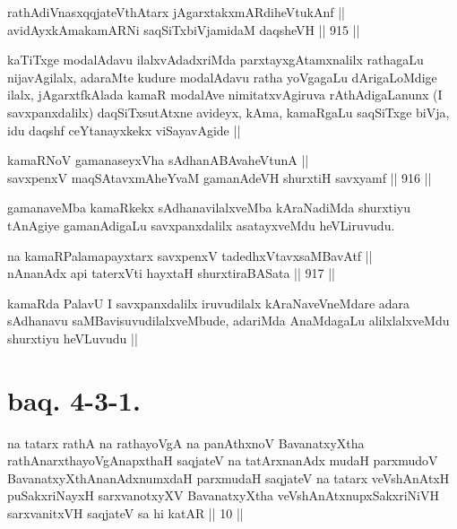 \begin{shl}
rathAdiVnasxqqjateV\s thAtarx jAgarxtakxmARdiheVtukAnf || \\
avidAyxkAmakamARNi saqSiTxbiVjamidaM daqsheVH ||  915 ||  
\end{shl}

\begin{artha}
kaTiTxge modalAdavu ilalxvAdadxriMda parxtayxgAtamxnalilx rathagaLu nijavAgilalx, adaraMte kudure modalAdavu ratha yoVgagaLu dArigaLoMdige ilalx, jAgarxtfkAlada kamaR modalAve nimitatxvAgiruva rAthAdigaLanunx (I savxpanxdalilx) daqSiTxsutAtxne avideyx, kAma, kamaRgaLu saqSiTxge biVja, idu daqshf ceYtanayxkekx viSayavAgide ||
\end{artha}


\begin{shl}
kamaRNoV gamanaseyxVha sAdhanABAvaheVtunA || \\
savxpenxV maqSAtavxmAheYvaM gamanAdeVH shurxtiH savxyamf ||  916 ||  
\end{shl}

\begin{artha}
gamanaveMba kamaRkekx sAdhanavilalxveMba kAraNadiMda shurxtiyu tAnAgiye gamanAdigaLu savxpanxdalilx asatayxveMdu heVLiruvudu.
\end{artha}


\begin{shl}
na kamaRPalamapayxtarx savxpenxV tadedhxVtavxsaMBavAtf || \\
nA\s \s nanAdx api taterxVti hayxtaH shurxtiraBASata ||  917 ||  
\end{shl}

\begin{artha}
kamaRda PalavU I savxpanxdalilx iruvudilalx kAraNaveVneMdare adara sAdhanavu saMBavisuvudilalxveMbude, adariMda AnaMdagaLu alilxlalxveMdu shurxtiyu heVLuvudu ||
\end{artha}

\section*{baq. 4-3-1.}

\begin{shl}
na tatarx rathA na rathayoVgA na panAthxnoV BavanatxyXtha rathAnarxthayoVgAnapxthaH saqjateV na tatArxnanAdx mudaH parxmudoV BavanatxyXthAnanAdxnumxdaH parxmudaH saqjateV na tatarx veVshAnAtxH puSakxriNayxH sarxvanotxyXV BavanatxyXtha veVshAnAtxnupxSakxriNiVH sarxvanitxVH saqjateV sa hi katAR || 10 ||
\end{shl}

